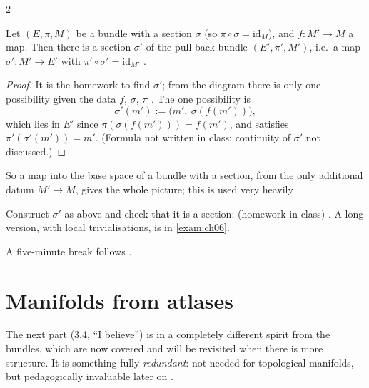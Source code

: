 \begin{paracol}{2}
\begin{proposition}\label{prop:mf-pullback-section}
Let $(E,\pi,M)$ be a bundle with a section $\sigma$ (so $\pi\circ\sigma=\mathrm{id}_M$), and $f\colon M'\to M$ a map. Then there is a section $\sigma'$ of the pull-back bundle $(E',\pi',M')$, i.e.\ a map $\sigma'\colon M'\to E'$ with $\pi'\circ\sigma'=\mathrm{id}_{M'}$
.
\end{proposition}
\begin{proof}
It is the homework to find $\sigma'$; from the diagram there is only one possibility given the data $f$, $\sigma$, $\pi$ . The one possibility is
\[
  \sigma'(m'):=\bigl(m',\ \sigma(f(m'))\bigr),
\]
which lies in $E'$ since $\pi(\sigma(f(m')))=f(m')$, and satisfies $\pi'(\sigma'(m'))=m'$. (Formula not written in class; continuity of $\sigma'$ not discussed.)
\end{proof}
So a map into the base space of a bundle with a section, from the only additional datum $M'\to M$, gives the whole picture; this is used very heavily .
\begin{exercise}\label{ex:mf-pullback-sec}
Construct $\sigma'$ as above and check that it is a section; (homework in class) . A long version, with local trivialisations, is in \cref{exam:ch06}.
\end{exercise}
A five-minute break follows .

\section{Manifolds from atlases}\label{sec:mf-atlas}

The next part (3.4, ``I believe'') is in a completely different spirit from the bundles, which are now covered and will be revisited when there is more structure. It is something fully \emph{redundant}: not needed for topological manifolds, but pedagogically invaluable later on
.


\end{paracol}
